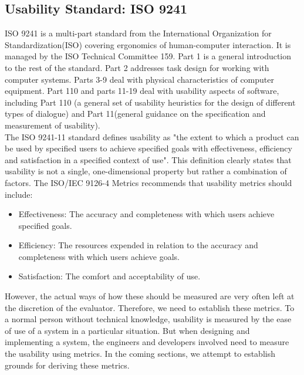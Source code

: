 \subsection{Usability Standard: ISO 9241}

ISO 9241 is a multi-part standard from the International Organization for Standardization(ISO) covering ergonomics of human-computer interaction. It is managed by the ISO Technical Committee 159. Part 1 is a general introduction to the rest of the standard. Part 2 addresses task design for working with computer systems. Parts 3-9 deal with physical characteristics of computer equipment. Part 110 and parts 11-19 deal with usability aspects of software, including Part 110 (a general set of usability heuristics for the design of different types of dialogue) and Part 11(general guidance on the specification and measurement of usability). \\

The ISO 9241-11 standard defines usability as "the extent to which a product can be used
by specified users to achieve specified goals with effectiveness, efficiency and satisfaction
in a specified context of use". This definition clearly states that usability is not a single,
one-dimensional property but rather a combination of factors.
The ISO/IEC 9126-4 Metrics recommends that usability metrics should include:
\begin{itemize}
\item Effectiveness: The accuracy and completeness with which users achieve specified
goals.

\item Efficiency: The resources expended in relation to the accuracy and completeness
with which users achieve goals.

\item Satisfaction: The comfort and acceptability of use.
\end{itemize}

However, the actual ways of how these should be measured are very often left at the
discretion of the evaluator. Therefore, we need to establish these metrics. To a normal
person without technical knowledge, usability is measured by the ease of use of a system in a
particular situation. But when designing and implementing a system, the engineers and
developers involved need to measure the usability using metrics. In the coming sections, we attempt to
establish grounds for deriving these metrics.

\medskip

